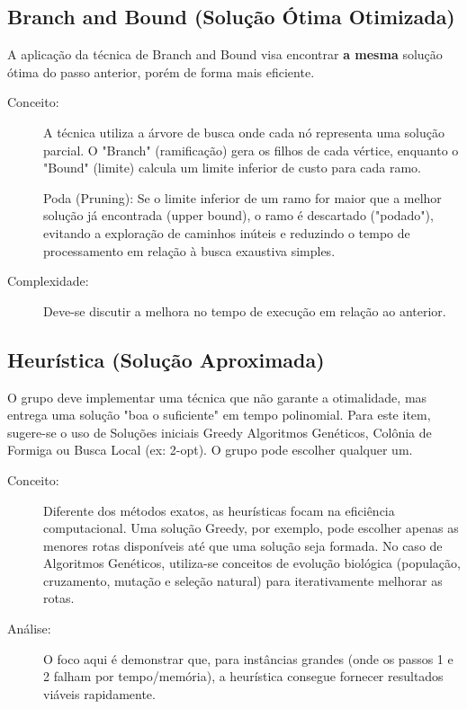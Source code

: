\subsection{Branch and Bound (Solução Ótima Otimizada)}

A aplicação da técnica de Branch and Bound visa encontrar \textbf{a mesma} solução ótima do passo anterior, porém de forma mais eficiente.

\begin{description}
    \item[Conceito:] A técnica utiliza a árvore de busca onde cada nó representa uma solução parcial. O "Branch" (ramificação) gera os filhos de cada vértice, enquanto o "Bound" (limite) calcula um limite inferior de custo para cada ramo.

    Poda (Pruning): Se o limite inferior de um ramo for maior que a melhor solução já encontrada (upper bound), o ramo é descartado ("podado"), evitando a exploração de caminhos inúteis e reduzindo o tempo de processamento em relação à busca exaustiva simples.

    \item[Complexidade:] Deve-se discutir a melhora no tempo de execução em relação ao anterior.

\end{description}






\subsection{Heurística (Solução Aproximada)}

O grupo deve implementar uma técnica que não garante a otimalidade, mas entrega uma solução "boa o suficiente" em tempo polinomial. Para este item, sugere-se o uso de Soluções iniciais Greedy Algoritmos Genéticos, Colônia de Formiga ou Busca Local (ex: 2-opt). O grupo pode escolher qualquer um.

\begin{description}
    \item[Conceito:] Diferente dos métodos exatos, as heurísticas focam na eficiência computacional. 
    Uma solução Greedy, por exemplo, pode escolher apenas as menores rotas disponíveis até que uma solução seja formada.
    No caso de Algoritmos Genéticos, utiliza-se conceitos de evolução biológica (população, cruzamento, mutação e seleção natural) para iterativamente melhorar as rotas. 

    \item[Análise:] O foco aqui é demonstrar que, para instâncias grandes (onde os passos 1 e 2 falham por tempo/memória), a heurística consegue fornecer resultados viáveis rapidamente.

\end{description}





